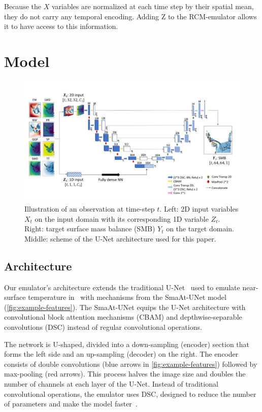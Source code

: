 \documentclass[a4paper,11pt,oneside]{report}
\begin{document}
Because the $X$ variables are normalized at each time step by their spatial mean, they do not carry any temporal encoding. Adding Z to the RCM-emulator allows it to have access to this information. 



\section{Model}\label{sec:model}

\begin{figure}[!t]
  \centering
  \includegraphics[width=\columnwidth]{doc/Thesis-latex/images/unet-with-data.pdf}
  \caption []{\small Illustration of an observation at time-step $t$. Left: 2D input variables $X_t$ on the input domain with its corresponding 1D variable $Z_t$. Right: target surface mass balance (SMB) $Y_t$ on the target domain. Middle: scheme of the U-Net architecture used for this paper.}
  \vspace{-3mm}
  \label{fig:example-features}
\end{figure}

\subsection{Architecture}\label{subsec:architecture}
Our emulator's architecture extends the traditional U-Net~\cite{unet} used to emulate near-surface temperature in~\cite{Doury} with mechanisms from the SmaAt-UNet model~\cite{smatunet} (\autoref{fig:example-features}). The SmaAt-UNet equips the U-Net architecture with convolutional block attention mechanisms (CBAM) and depthwise-separable convolutions (DSC) instead of regular convolutional operations.

The network is U-shaped, divided into a down-sampling (encoder) section that forms the left side and an up-sampling (decoder) on the right. The encoder consists of double convolutions (blue arrows in \autoref{fig:example-features}) followed by max-pooling (red arrows). This process halves the image size and doubles the number of channels at each layer of the U-Net. Instead of traditional convolutional operations, the emulator uses DSC, designed to reduce the number of parameters and make the model faster~\cite{smatunet}. 
\end{document}
